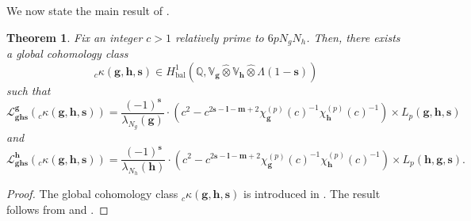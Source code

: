 \documentclass[a4paper,11pt]{amsart}
\theoremstyle{plain}
\newtheorem{theorem}{Theorem}[section]
\theoremstyle{definition}
\theoremstyle{remark}
\newcommand{\cl}{\mathcal}
\DeclareMathOperator{\bal}{bal}
\newcommand{\hg}{{\mathbf{g}}}
\newcommand{\hh}{{\mathbf h}}
\newcommand{\res}{\mathrm{res}}
\numberwithin{equation}{section}
\begin{document}

We now state the main result of \cite{KLZ}.

\begin{theorem}\label{reclaw}
Fix an integer $c>1$ relatively prime to $6pN_gN_h$. Then, there exists a global cohomology class \[ _c\kappa(\hg,\hh,\mathbf{s}) \in H^1_{\bal}(\mathbb Q, \mathbb V_{\hg} \hat \otimes \mathbb V_{\hh} \hat \otimes \Lambda(1-\mathbf{s})) \] such that
\[
\cl{L}_{\hg\hh\mathbf{s}}^{\hg}(_c\kappa(\hg,\hh,\mathbf{s}))=\frac{(-1)^{\mathbf{s}}}{\lambda_{N_g}(\hg)} \cdot (c^2-c^{2\mathbf{s}-\mathbf{l}-\mathbf{m}+2}\chi_{\hg}^{(p)}(c)^{-1}\chi_{\hh}^{(p)}(c)^{-1}) \times L_p(\hg,\hh,\mathbf{s})
\]
and
\[
\cl{L}_{\hg\hh\mathbf{s}}^{\hh}(_c\kappa(\hg,\hh,\mathbf{s}))=\frac{(-1)^{\mathbf{s}}}{\lambda_{N_h}(\hh)} \cdot (c^2-c^{2\mathbf{s}-\mathbf{l}-\mathbf{m}+2}\chi_{\hg}^{(p)}(c)^{-1}\chi_{\hh}^{(p)}(c)^{-1}) \times L_p(\hh,\hg,\mathbf{s}).
\]
\end{theorem}
\begin{proof}
The global cohomology class $_c \kappa(\hg,\hh,\mathbf{s})$ is introduced in \cite[Definition 8.1.1]{KLZ}. The result follows from \cite[Proposition 8.1.7]{KLZ} and \cite[Theorem~B]{KLZ}.
\end{proof}
\end{document}
